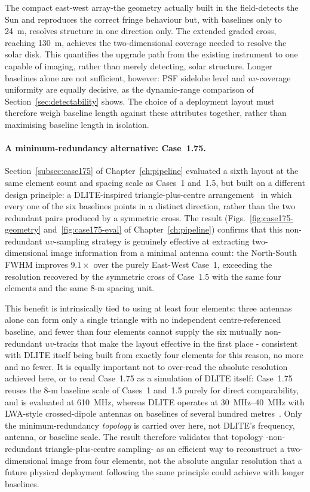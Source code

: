 The compact east-west array-the geometry actually built in the field-detects the Sun
and reproduces the correct fringe behaviour but, with baselines only to \SI{24}{\metre},
resolves structure in one direction only. The extended graded cross, reaching
\SI{130}{\metre}, achieves the two-dimensional coverage needed to resolve the solar disk.
This quantifies the upgrade path from the existing instrument to one capable of imaging,
rather than merely detecting, solar structure. Longer baselines alone are not
sufficient, however: PSF sidelobe level and $uv$-coverage uniformity are equally
decisive, as the dynamic-range comparison of Section~\ref{sec:detectability} shows. The
choice of a deployment layout must therefore weigh baseline length against these
attributes together, rather than maximising baseline length in isolation.

\paragraph{A minimum-redundancy alternative: Case~1.75.} Section~\ref{subsec:case175}
of Chapter~\ref{ch:pipeline} evaluated a sixth layout at the same element count and
spacing scale as Cases~1 and~1.5, but built on a different design principle: a
DLITE-inspired triangle-plus-centre arrangement~\citep{helmboldt2021dlite} in which
every one of the six baselines points in a distinct direction, rather than the two
redundant pairs produced by a symmetric cross. The result (Figs.~\ref{fig:case175-geometry}
and~\ref{fig:case175-eval} of Chapter~\ref{ch:pipeline}) confirms that this
non-redundant $uv$-sampling strategy is genuinely effective at extracting
two-dimensional image information from a minimal antenna count: the North-South FWHM
improves $9.1\times$ over the purely East-West Case~1, exceeding the resolution
recovered by the symmetric cross of Case~1.5 with the same four elements and the same
$8$-m spacing unit.

This benefit is intrinsically tied to using at least four elements: three antennas
alone can form only a single triangle with no independent centre-referenced baseline,
and fewer than four elements cannot supply the six mutually non-redundant $uv$-tracks
that make the layout effective in the first place - consistent with DLITE itself being
built from exactly four elements for this reason, no more and no fewer. It is equally
important not to over-read the absolute resolution achieved here, or to read Case~1.75
as a simulation of DLITE itself: Case~1.75 reuses the $8$-m baseline scale of Cases~1
and~1.5 purely for direct comparability, and is evaluated at \SI{610}{\mega\hertz},
whereas DLITE operates at \SIrange{30}{40}{\mega\hertz} with LWA-style crossed-dipole
antennas on baselines of several hundred metres~\citep{helmboldt2021dlite,carson2022dlite}.
Only the minimum-redundancy \emph{topology} is carried over here, not DLITE's
frequency, antenna, or baseline scale. The result therefore validates that topology
-non-redundant triangle-plus-centre sampling- as an efficient way to reconstruct a
two-dimensional image from four elements, not the absolute angular resolution that a
future physical deployment following the same principle could achieve with longer
baselines.

